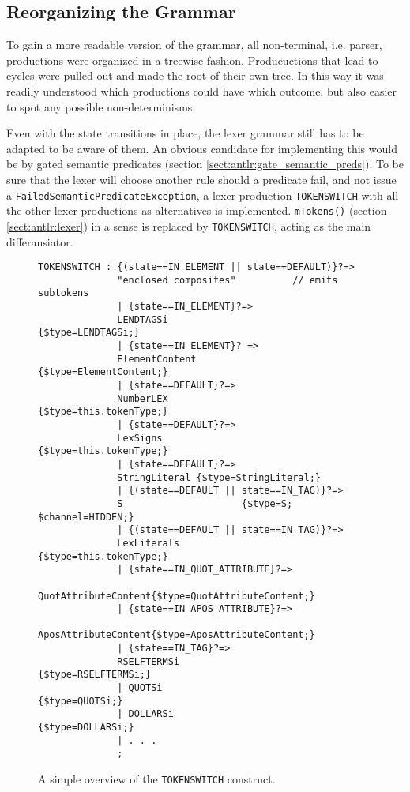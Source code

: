 \subsection{Reorganizing the Grammar}
\label{sect:rewriteGrammar:reorganizing}

To gain a more readable version of the grammar, all non-terminal, i.e. parser, productions were organized in a treewise fashion. Producuctions that lead to cycles were pulled out and made the root of their own tree. In this way it was readily understood which productions could have which outcome, but also easier to spot any possible non-determinisms.

Even with the state transitions in place, the lexer grammar still has to be adapted to be aware of them. An obvious candidate for implementing this would be by gated semantic predicates (section \ref{sect:antlr:gate_semantic_preds}). To be sure that the lexer will choose another rule should a predicate fail, and not issue a \verb!FailedSemanticPredicateException!, a lexer production \verb!TOKENSWITCH! with all the other lexer productions as alternatives is implemented. \verb!mTokens()! (section \ref{sect:antlr:lexer}) in a sense is replaced by \verb!TOKENSWITCH!, acting as the main differansiator. 

\begin{figure}[h!]
\begin{verbatim}
TOKENSWITCH : {(state==IN_ELEMENT || state==DEFAULT)}?=>
              "enclosed composites"          // emits subtokens
              | {state==IN_ELEMENT}?=>
              LENDTAGSi                      {$type=LENDTAGSi;}
              | {state==IN_ELEMENT}? =>
              ElementContent            {$type=ElementContent;} 
              | {state==DEFAULT}?=>
              NumberLEX	                {$type=this.tokenType;}
              | {state==DEFAULT}?=>
              LexSigns                  {$type=this.tokenType;}
              | {state==DEFAULT}?=>
              StringLiteral {$type=StringLiteral;}
              | {(state==DEFAULT || state==IN_TAG)}?=>
              S                     {$type=S; $channel=HIDDEN;}
              | {(state==DEFAULT || state==IN_TAG)}?=>
              LexLiterals               {$type=this.tokenType;} 
              | {state==IN_QUOT_ATTRIBUTE}?=>
              QuotAttributeContent{$type=QuotAttributeContent;}
              | {state==IN_APOS_ATTRIBUTE}?=>
              AposAttributeContent{$type=AposAttributeContent;}
              | {state==IN_TAG}?=>
              RSELFTERMSi                  {$type=RSELFTERMSi;}
              | QUOTSi                          {$type=QUOTSi;}
              | DOLLARSi                      {$type=DOLLARSi;}
              | . . .
              ;

\end{verbatim}
\caption[Overview of the \texttt{TOKENSWITCH} construct]{A simple overview of the \texttt{TOKENSWITCH} construct.}
\label{fig:tokenswitch}
\end{figure}

